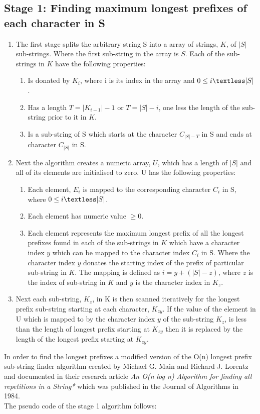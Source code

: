 \documentclass[12pt]{article}
\begin{document}
\subsection{Stage 1: Finding maximum longest prefixes of each character in S}
\begin{enumerate}


\item The first stage splits the arbitrary string S into a array of strings, $K$, of $|S|$ sub-strings. Where the first sub-string in the array is $S$.
Each of the sub-strings in $K$ have the following properties:
\begin{enumerate}
	\item Is donated by $K_{i}$, where i is its index in the array and $ 0 \le i \textless |S|$.
	\item Has a length $T = |K_{i-1}| - 1$ or $T = |S| - i$, one less the length of the sub-string prior to it in $K$.
	\item Is a sub-string of S which starts at the character $C_{|S| - T} $ in S and ends at character $C_{|S|}$ in S.
\end{enumerate}

\item Next the algorithm creates a numeric array, $U$, which has a length of $|S|$ and all of its elements are initialised to zero. 
U has the following properties:
\begin{enumerate}
	\item Each element, $E_{i}$ is mapped to the corresponding character $C_{i}$ in S, where $ 0 \le i \textless |S|$.
	\item Each element has numeric value $\ge 0$.
	\item Each element represents the maximum longest prefix of all the longest prefixes found in each of the sub-strings in $K$ which have a character index $y$ which can be mapped to the character index $C_{i}$ in S. Where the character index $y$ donates the starting index of the prefix of particular sub-string in $K$. The mapping is defined as $i = y + (|S| - z)$, where $z$ is the index of sub-string in $K$ and $y$ is the character index in $K_{z}$.   
	
\end{enumerate}

\item Next each sub-string, $K_{z}$, in K is then scanned iteratively for the longest prefix sub-string starting at each character, $K_{zy}$. If the value of the element in U which is mapped to by the character index $y$ of the sub-string $K_{z}$, is less than the length of longest prefix starting at $K_{zy}$ then it is replaced by the length of the longest prefix starting at $K_{zy}$. \\
\end{enumerate}
  
In order to find the longest prefixes a modified version of the O(n) longest prefix sub-string finder algorithm created by Michael G. Main and Richard J. Lorentz and documented in their research article \textit{An O(n log n) Algorithm for finding all repetitions in a String*} which was published in the Journal of Algorithms in 1984.\\

The pseudo code of the stage 1 algorithm follows:
\end{document}
